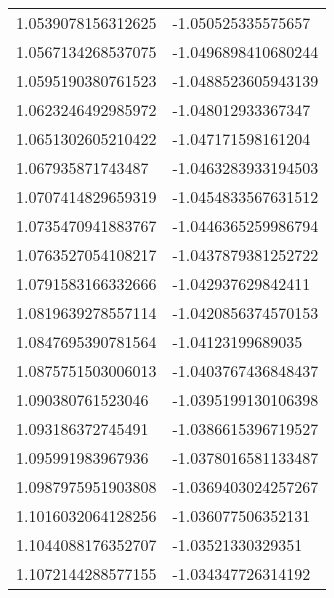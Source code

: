 \begin{supertabular}{ll}
1.0539078156312625  & -1.050525335575657    \\
1.0567134268537075  & -1.0496898410680244   \\
1.0595190380761523  & -1.0488523605943139   \\
1.0623246492985972  & -1.048012933367347    \\
1.0651302605210422  & -1.047171598161204    \\
1.067935871743487   & -1.0463283933194503   \\
1.0707414829659319  & -1.0454833567631512   \\
1.0735470941883767  & -1.0446365259986794   \\
1.0763527054108217  & -1.0437879381252722   \\
1.0791583166332666  & -1.042937629842411    \\
1.0819639278557114  & -1.0420856374570153   \\
1.0847695390781564  & -1.04123199689035     \\
1.0875751503006013  & -1.0403767436848437   \\
1.090380761523046   & -1.0395199130106398   \\
1.093186372745491   & -1.0386615396719527   \\
1.095991983967936   & -1.0378016581133487   \\
1.0987975951903808  & -1.0369403024257267   \\
1.1016032064128256  & -1.036077506352131    \\
1.1044088176352707  & -1.03521330329351     \\
1.1072144288577155  & -1.034347726314192    \\
\end{supertabular}
